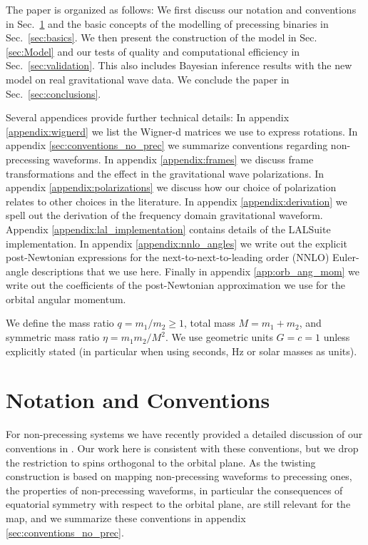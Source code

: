 \documentclass[%
aps,
prd,
amssymb,
amsmath,
amsfonts,
eqsecnum,
showpacs,
nofootinbib,
floatfix,
twocolumn,
twoside,
a4paper,
superscriptaddress
]{revtex4-1}
\begin{document}
The paper is organized as follows:
We first discuss our notation and conventions
in Sec.~\ref{sec:conventions} and the basic concepts of the modelling of precessing binaries in Sec.~\ref{sec:basics}. We then present the
construction of the model in Sec. \ref{sec:Model} 
and our tests of quality and computational efficiency in Sec.~\ref{sec:validation}.
This also includes Bayesian inference results with the new model on real gravitational wave data.
We conclude the paper in Sec.~\ref{sec:conclusions}.

Several appendices provide further technical details:
In appendix \ref{appendix:wignerd} we list the Wigner-d matrices we use to express rotations.
In appendix \ref{sec:conventions_no_prec}
we summarize conventions regarding non-precessing waveforms.
In appendix \ref{appendix:frames} we discuss frame transformations and the effect in the gravitational wave polarizations.
In appendix \ref{appendix:polarizations}
we discuss how our choice of polarization relates to other choices in the literature.
In appendix \ref{appendix:derivation} we spell out the derivation of the frequency domain gravitational waveform.
Appendix \ref{appendix:lal_implementation} contains details of the LALSuite implementation.
In appendix \ref{appendix:nnlo_angles} we write out the explicit post-Newtonian expressions for the next-to-next-to-leading order (NNLO) Euler-angle descriptions that we use here.
Finally in appendix \ref{app:orb_ang_mom} we write out the coefficients of the post-Newtonian approximation we use for the orbital angular momentum.

We define the mass ratio $q = m_1/m_2 \geq 1$, total mass $M=m_1+m_2$, and symmetric mass ratio $\eta = m_1 m_2 /M^2$. We use geometric units $G=c=1$ unless explicitly stated (in particular when using seconds, Hz or solar masses as units).



\section{Notation and Conventions}
\label{sec:conventions}

For non-precessing systems we have recently provided a detailed discussion of our conventions in \cite{Pratten:2020fqn,Garcia-Quiros:2020qpx}. Our work here is consistent with these conventions, but we drop the restriction to spins orthogonal to the orbital plane.
As the twisting construction is based on mapping non-precessing waveforms to precessing ones, the properties of non-precessing waveforms, in particular the consequences of equatorial symmetry with respect to the orbital plane, are still relevant for the map, and we summarize these conventions in appendix \ref{sec:conventions_no_prec}.
\end{document}
